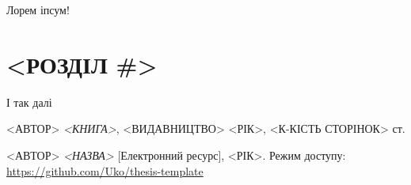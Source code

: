 \documentclass[12pt,a4paper]{article}
\begin{document}
Лорем іпсум!\cite{alias}

\clearpage

\section{<РОЗДІЛ \#>}

І так далі\cite{web}

\clearpage
{}
\begin{thebibliography}{9}

  <АВТОР> \emph{<КНИГА>},
    <ВИДАВНИЦТВО> <РІК>, <К-КІСТЬ СТОРІНОК> ст.
    
  <АВТОР> \emph{<НАЗВА>} [Електронний ресурс],
    <РІК>. Режим доступу:
    \url{https://github.com/Uko/thesis-template}

\end{thebibliography}
\end{document}

